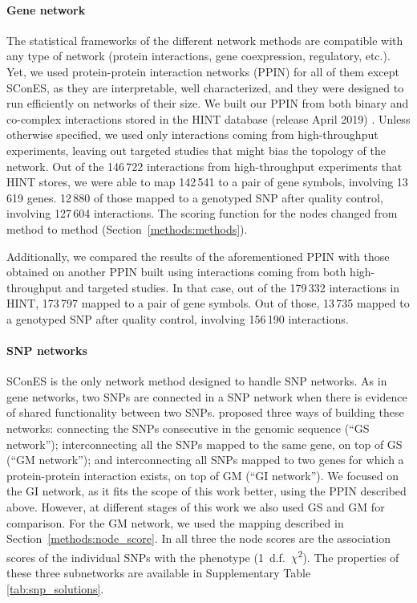 \documentclass[twocolumn, 11pt]{article}
\begin{document}
\paragraph{Gene network}
The statistical frameworks of the different network methods are compatible with any type of network (protein interactions, gene coexpression, regulatory, etc.). Yet, we used protein-protein interaction networks (PPIN) for all of them except SConES, as they are interpretable, well characterized, and they were designed to run efficiently on networks of their size. We built our PPIN from both binary and co-complex interactions stored in the HINT database (release April 2019) \cite{das_hint:_2012}. Unless otherwise specified, we used only interactions coming from high-throughput experiments, leaving out targeted studies that might bias the topology of the network. Out of the 146\,722 interactions from high-throughput experiments that HINT stores, we were able to map 142\,541 to a pair of gene symbols, involving 13\,619 genes. 12\,880 of those mapped to a genotyped SNP after quality control, involving 127\,604 interactions. The scoring function for the nodes changed from method to method (Section~\ref{methods:methods}).

Additionally, we compared the results of the aforementioned PPIN with those obtained on another PPIN built using interactions coming from both high-throughput and targeted studies. In that case, out of the 179\,332 interactions in HINT, 173\,797 mapped to a pair of gene symbols. Out of those, 13\,735 mapped to a genotyped SNP after quality control, involving 156\,190 interactions.

\paragraph{SNP networks}
SConES \cite{azencott_efficient_2013} is the only network method designed to handle SNP networks. As in gene networks, two SNPs are connected in a SNP network when there is evidence of shared functionality between two SNPs. \citet{azencott_efficient_2013} proposed three ways of building these networks: connecting the SNPs consecutive in the genomic sequence (``GS network''); interconnecting all the SNPs mapped to the same gene, on top of GS (``GM network''); and interconnecting all SNPs mapped to two genes for which a protein-protein interaction exists, on top of GM (``GI network''). We focused on the GI network, as it fits the scope of this work better, using the PPIN described above. However, at different stages of this work we also used GS and GM for comparison. For the GM network, we used the mapping described in Section~\ref{methods:node_score}. In all three the node scores are the association scores of the individual SNPs with the phenotype (1~d.f.~\(\chi\)\textsuperscript{2}). The properties of these three subnetworks are available in Supplementary Table \ref{tab:snp_solutions}.
\end{document}
